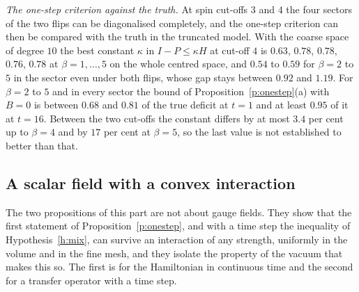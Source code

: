 \emph{The one-step criterion against the truth.} At spin cut-offs $3$ and $4$ the four sectors of the two
flips can be diagonalised completely, and the
one-step criterion can then be compared with the truth in the truncated model. With the coarse space of
degree $10$ the best constant $\kappa$ in $I-P\le\kappa H$ at cut-off $4$ is $0.63$, $0.78$, $0.78$, $0.76$,
$0.78$ at $\beta=1,\dots,5$ on the whole centred space, and $0.54$ to $0.59$ for $\beta=2$ to $5$ in the
sector even under both flips, whose gap stays between $0.92$ and $1.19$. For $\beta=2$ to $5$ and in every
sector the bound of Proposition~\ref{p:onestep}(a) with $B=0$ is between $0.68$ and $0.81$ of the true
deficit at $t=1$ and at least $0.95$ of it at $t=16$. Between the two cut-offs the constant differs by at
most $3.4$ per cent up to $\beta=4$ and by $17$ per cent at $\beta=5$, so the last value is not established
to better than that.

\subsection*{A scalar field with a convex interaction}
The two propositions of this part are not about gauge fields. They show that the first statement of
Proposition~\ref{p:onestep}, and with a time step the inequality of Hypothesis~\ref{h:mix}, can survive an
interaction of any strength, uniformly in the volume and in the fine mesh, and they isolate the property of
the vacuum that makes this so. The first is for the Hamiltonian in continuous time and the second for a
transfer operator with a time step.

